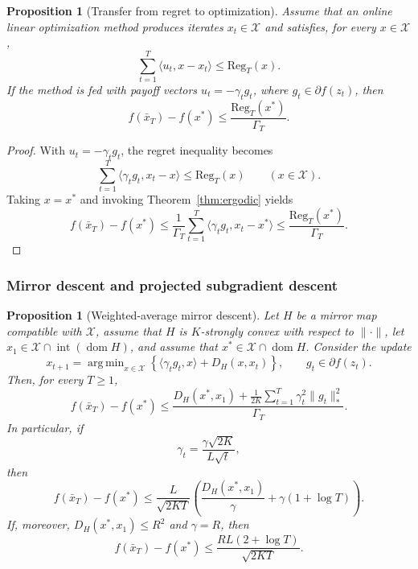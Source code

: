 \documentclass[11pt]{article}
\newtheorem{proposition}[theorem]{Proposition}
\theoremstyle{definition}
\theoremstyle{remark}
\newcommand{\X}{\mathcal{X}}
\newcommand{\inner}[2]{\langle #1, #2 \rangle}
\newcommand{\norm}[1]{\lVert #1 \rVert}
\newcommand{\normdual}[1]{\lVert #1 \rVert_*}
\DeclareMathOperator*{\argmin}{arg\,min}
\DeclareMathOperator{\dom}{dom}
\begin{document}
\begin{proposition}[Transfer from regret to optimization]
\label{prop:transfer}
Assume that an online linear optimization method produces iterates $x_t \in \X$ and satisfies, for every $x \in \X$,
\[
    \sum_{t=1}^T \inner{u_t}{x-x_t} \le \mathrm{Reg}_T(x).
\]
If the method is fed with payoff vectors $u_t = -\gamma_t g_t$, where $g_t \in \partial f(z_t)$, then
\[
    f(\bar{x}_T)-f(x^*)
    \le
    \frac{\mathrm{Reg}_T(x^*)}{\Gamma_T}.
\]
\end{proposition}

\begin{proof}
With $u_t=-\gamma_t g_t$, the regret inequality becomes
\[
    \sum_{t=1}^T \inner{\gamma_t g_t}{x_t-x} \le \mathrm{Reg}_T(x)
    \qquad (x \in \X).
\]
Taking $x=x^*$ and invoking Theorem~\ref{thm:ergodic} yields
\[
    f(\bar{x}_T)-f(x^*)
    \le
    \frac{1}{\Gamma_T}\sum_{t=1}^T \inner{\gamma_t g_t}{x_t-x^*}
    \le
    \frac{\mathrm{Reg}_T(x^*)}{\Gamma_T}.
\]
\end{proof}

\subsubsection{Mirror descent and projected subgradient descent}

\begin{proposition}[Weighted-average mirror descent]
\label{prop:mirror-descent}
Let $H$ be a mirror map compatible with $\X$, assume that $H$ is $K$-strongly convex with respect to $\norm{\cdot}$, let $x_1 \in \X \cap \operatorname{int}(\dom H)$, and assume that $x^* \in \X \cap \dom H$. Consider the update
\[
    x_{t+1}
    =
    \argmin_{x \in \X}
    \left\{
        \inner{\gamma_t g_t}{x}
        +
        D_H(x,x_t)
    \right\},
    \qquad
    g_t \in \partial f(z_t).
\]
Then, for every $T\ge 1$,
\[
    f(\bar{x}_T)-f(x^*)
    \le
    \frac{D_H(x^*,x_1) + \frac{1}{2K}\sum_{t=1}^T \gamma_t^2\normdual{g_t}^2}{\Gamma_T}.
\]
In particular, if
\[
    \gamma_t = \frac{\gamma \sqrt{2K}}{L\sqrt{t}},
\]
then
\[
    f(\bar{x}_T)-f(x^*)
    \le
    \frac{L}{\sqrt{2KT}}
    \left(
        \frac{D_H(x^*,x_1)}{\gamma}
        +
        \gamma(1+\log T)
    \right).
\]
If, moreover, $D_H(x^*,x_1)\le R^2$ and $\gamma=R$, then
\[
    f(\bar{x}_T)-f(x^*) 
    \le
    \frac{RL(2+\log T)}{\sqrt{2KT}}.
\]
\end{proposition}
\end{document}
